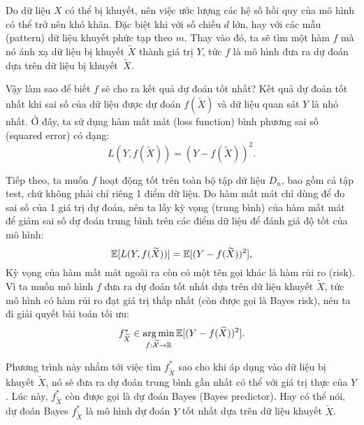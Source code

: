 Do dữ liệu $X$ có thể bị khuyết, nên việc ước lượng các hệ số hồi quy của mô hình có thể trở nên khó khăn. Đặc biệt khi với số chiều $d$ lớn, hay với các mẫu (pattern) dữ liệu khuyết phức tạp theo $m$.
Thay vào đó, ta sẽ tìm một hàm $f$ mà nó ánh xạ dữ liệu 
bị khuyết $\widetilde{X}$ 
thành giá trị $Y$, tức $f$ là mô hình đưa ra dự đoán dựa trên dữ liệu 
bị khuyết~$\widetilde{X}$.


Vậy làm sao để biết $f$ sẽ cho ra kết quả dự đoán tốt nhất? Kết quả dự đoán tốt nhất khi sai số của dữ liệu được dự đoán $f(\widetilde{X})$ và dữ liệu quan sát $Y$ là nhỏ nhất. Ở đây, ta sử dụng hàm mất mát (loss function) bình phương sai số (squared error) có dạng:
\[
    L (Y, f(\widetilde{X})) = (Y - f(\widetilde{X}))^2.
\]

Tiếp theo, ta muốn $f$ hoạt động tốt trên toàn bộ tập dữ liệu $D_n$, bao gồm cả tập test, chứ không phải chỉ riêng 1 điểm dữ liệu. Do hàm mất mát chỉ dùng để đo sai số của 1 giá trị dự đoán, nên ta lấy kỳ vọng (trung bình) của hàm mất mát để giảm sai số dự đoán trung bình trên các điểm dữ liệu để đánh giá độ tốt của mô hình:
\[
    \mathbb{E} [L(Y, f(\widetilde{X}))] = \mathbb{E}[(Y - f(\widetilde{X}))^2],
\]
Kỳ vọng của hàm mất mát ngoài ra còn có một tên gọi khác là hàm rủi ro (risk).
Vì ta muốn mô hình $f$ đưa ra dự đoán tốt nhất dựa trên dữ liệu khuyết $\tilde{X}$,
tức mô hình có hàm rủi ro đạt giá trị thấp nhất (còn được gọi là Bayes risk),
nên ta đi giải quyết bài toán tối ưu:
\begin{equation}\label{eq:bayes_predictor_optimization_form}
    f_{\widetilde{X}}^* \in \operatorname*{arg\,min}_{f: \widetilde{\mathcal{X}} \to \mathbb R} \mathbb{E} [(Y - f(\widetilde{X}))^2].
\end{equation}

Phương trình này nhắm tới việc tìm $f_{\tilde{X}}^*$ sao cho khi áp dụng vào dữ liệu bị khuyết $\tilde{X}$, nó sẽ đưa ra dự đoán trung bình gần nhất có thể với giá trị thực của $Y$. 
Lúc này, $f_{\widetilde{X}}^*$ còn được gọi là dự đoán Bayes (Bayes predictor).
Hay có thể nói, dự đoán Bayes $f_{\widetilde{X}}^*$ là mô hình dự đoán $Y$ tốt nhất dựa trên dữ liệu khuyết $\widetilde{X}$.


